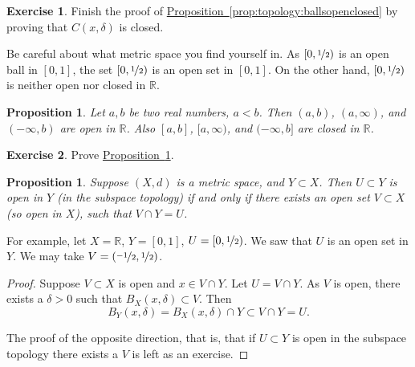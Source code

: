 \documentclass[12pt,openany]{book}
\newcommand{\R}{{\mathbb{R}}}
\theoremstyle{plain}
\newtheorem{prop}[thm]{Proposition}
\theoremstyle{remark}
\theoremstyle{definition}
\newenvironment{exbox}{%
    \def\FrameCommand{\vrule width 1pt \relax\hspace{10pt}}%
    \MakeFramed{\advance\hsize-\width\FrameRestore}%
}{%
    \endMakeFramed
}
\theoremstyle{exercise}
\newtheorem{exercise}{Exercise}[section]
\theoremstyle{example}
\newcommand{\propref}[1]{\hyperref[#1]{Proposition~\ref*{#1}}}
\begin{document}
\begin{exbox}
\begin{exercise}
Finish the proof of \propref{prop:topology:ballsopenclosed} by
proving that $C(x,\delta)$ is closed.
\end{exercise}
\end{exbox}

Be careful about what metric space you find yourself in.
As $[0,\nicefrac{1}{2})$ is
an open ball in $[0,1]$, the set $[0,\nicefrac{1}{2})$ is
an open set in $[0,1]$.  On the other hand, $[0,\nicefrac{1}{2})$
is neither open nor closed in $\R$.

\begin{prop} \label{prop:topology:intervals:openclosed}
Let $a,b$ be two real numbers, $a < b$.  Then $(a,b)$, $(a,\infty)$,
and $(-\infty,b)$ are open in $\R$.
Also $[a,b]$, $[a,\infty)$,
and $(-\infty,b]$ are closed in $\R$.
\end{prop}


\begin{exbox}
\begin{exercise}
Prove \propref{prop:topology:intervals:openclosed}.
\end{exercise}
\end{exbox}

\begin{prop} \label{prop:topology:subspaceopen}
Suppose $(X,d)$ is a metric space, and $Y \subset X$.  Then $U \subset Y$
is open in $Y$ (in the subspace topology) if and only if
there exists an open set $V \subset X$ (so open in $X$), such that
$V \cap Y = U$.
\end{prop}

For example, let $X = \R$, $Y=[0,1]$, $U = [0,\nicefrac{1}{2})$.
We saw that $U$ is an open set in $Y$.
We may take $V = (\nicefrac{-1}{2},\nicefrac{1}{2})$.

\begin{proof}
Suppose $V \subset X$ is open and $x \in V \cap Y$.
Let $U = V \cap Y$.
As $V$ is open, there
exists a $\delta > 0$ such that $B_X(x,\delta) \subset V$.
Then
\begin{equation*}
B_Y(x,\delta) = B_X(x,\delta) \cap Y \subset V \cap Y = U .
\end{equation*}

The proof of the opposite direction, that is, that if $U \subset Y$
is open in the subspace topology there exists a $V$ is left as
an exercise.
\end{proof}
\end{document}
